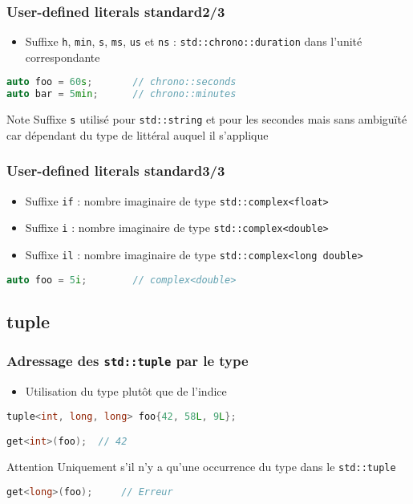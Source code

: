 \documentclass[C++.tex]{subfiles}
\begin{document}
\begin{frame}[fragile]
	\frametitle{User-defined literals standard\titlehfill{}2/3}
	\begin{itemize}
		\item Suffixe \lstinline|h|, \lstinline|min|, \lstinline|s|, \lstinline|ms|, \lstinline|us| et \lstinline|ns| : \lstinline|std::chrono::duration| dans l'unité correspondante
	\end{itemize}

	\begin{lstlisting}[language=C++]
auto foo = 60s;       // chrono::seconds
auto bar = 5min;      // chrono::minutes\end{lstlisting}

	\begin{block}{Note}
		Suffixe \lstinline|s| utilisé pour \lstinline|std::string| et pour les secondes mais sans ambiguïté car dépendant du type de littéral auquel il s'applique
	\end{block}
\end{frame}

\begin{frame}[fragile]
	\frametitle{User-defined literals standard\titlehfill{}3/3}
	\begin{itemize}
		\item Suffixe \lstinline|if| : nombre imaginaire de type \lstinline|std::complex<float>|
		\item Suffixe \lstinline|i| : nombre imaginaire de type \lstinline|std::complex<double>|
		\item Suffixe \lstinline|il| : nombre imaginaire de type \lstinline|std::complex<long double>|
	\end{itemize}

	\begin{lstlisting}[language=C++]
auto foo = 5i;        // complex<double>\end{lstlisting}
\end{frame}

\subsection*{tuple}
\begin{frame}[fragile]
	\frametitle{Adressage des \lstinline|std::tuple| par le type}
	\begin{itemize}
		\item Utilisation du type plutôt que de l'indice
	\end{itemize}

	\begin{lstlisting}[language=C++]
tuple<int, long, long> foo{42, 58L, 9L};

get<int>(foo);	// 42\end{lstlisting}

	\pause

	\begin{alertblock}{Attention}
		Uniquement s'il n'y a qu'une occurrence du type dans le \lstinline|std::tuple|
	\begin{lstlisting}[language=C++]
get<long>(foo);     // Erreur\end{lstlisting}
	\end{alertblock}
\end{frame}
\end{document}
